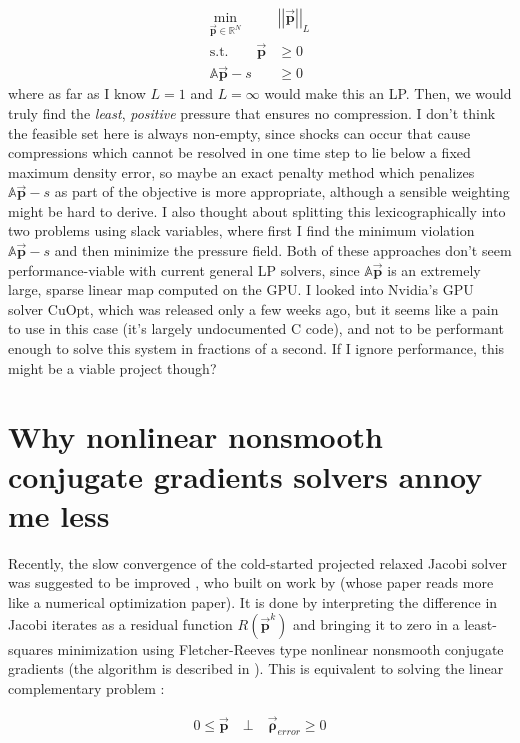 \documentclass[oneside, a4paper]{book}
\newcommand\abss[1]{\left|\left|#1\right|\right|}
\newcommand\vek[1]{\vec{\bm{#1}}}
\newcommand\mat[1]{{\mathds{#1}}}
\begin{document}
\begin{align*}
    \min_{\vek{p}\in\mathds{R}^N} &\abss{\vek{p}}_L\\
    \text{s.t.}\quad\quad \vek{p}&\geq 0\\
    \mat{A}\vek{p} - s &\geq 0
\end{align*}
where as far as I know $L=1$ and $L=\infty$ would make this an LP. Then, we would truly find the \textit{least}, \textit{positive} pressure that ensures no compression. I don't think the feasible set here is always non-empty, since shocks can occur that cause compressions which cannot be resolved in one time step to lie below a fixed maximum density error, so maybe an exact penalty method which penalizes $ \mat{A}\vek{p} - s$ as part of the objective is more appropriate, although a sensible weighting might be hard to derive. I also thought about splitting this lexicographically into two problems using slack variables, where first I find the minimum violation $\mat{A}\vek{p} - s$ and then minimize the pressure field. Both of these approaches don't seem performance-viable with current general LP solvers, since $\mat{A}\vek{p}$ is an extremely large, sparse linear map computed on the GPU. I looked into Nvidia's GPU solver CuOpt, which was released only a few weeks ago, but it seems like a pain to use in this case (it's largely undocumented C code), and not to be performant enough to solve this system in fractions of a second. If I ignore performance, this might be a viable project though?

\section*{Why nonlinear nonsmooth conjugate gradients solvers annoy me less}
Recently, the slow convergence of the cold-started projected relaxed Jacobi solver was suggested to be improved \autocite[by Probst \& Teschner from our Computer Graphics group]{unified-pressure}, who built on work by \autocite[Silcowitz-Hansen et. al]{nncg} (whose paper reads more like a numerical optimization paper). It is done by interpreting the difference in Jacobi iterates as a residual function $R(\vek{p}^k)$ and bringing it to zero in a least-squares minimization using Fletcher-Reeves type nonlinear nonsmooth conjugate gradients (the algorithm is described in \autocite[Appendix B, page 27]{unified-pressure}). This is equivalent to solving the linear complementary problem \autocite{unified-pressure}:

\begin{align*}
    0\leq \vek{p} \quad\bot\quad \vek{\rho}_{error} \geq 0
\end{align*}
\end{document}
